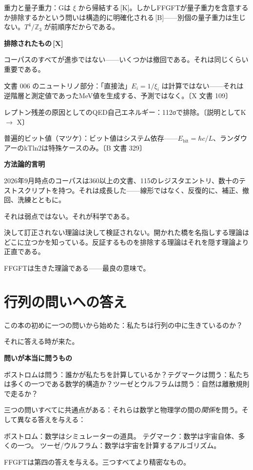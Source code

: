 \documentclass[11pt,openany]{book}
\newcommand{\status}[1]{\penalty10000\,{\tiny\textcolor{gray!70}{[#1]}}}
\begin{document}
重力と量子重力：Gは $\xi$ から帰結する\status{K}。しかしFFGFTが量子重力を含意するか排除するかという問いは構造的に明確化される\status{B}——別個の量子重力は生じない。$T^4/\mathbb{Z}_3$ が前順序だからである。

\textbf{排除されたもの\status{X}}

コーパスのすべてが進歩ではない——いくつかは撤回である。それは同じくらい重要である。

文書 006 のニュートリノ部分：「直接法」$E_i = 1/\xi_i$ は計算ではない——それは逆階層と測定値であったMeV値を生成する、予測ではなく。〔X 文書 109〕

レプトン残差の原因としてのQED自己エネルギー：112σで排除。〔説明としてK $\to$ X〕

普遍的ビット値（マツケ）：ビット値はシステム依存——$E_\text{bit} = \hbar c/L$、ランダウアーのkTln2は特殊ケースのみ。〔B 文書 329〕

\textbf{方法論的言明}

2026年9月時点のコーパスは360以上の文書、115のレジスタエントリ、数十のテストスクリプトを持つ。それは成長した——線形ではなく、反復的に、補正、撤回、洗練とともに。

それは弱点ではない。それが科学である。

決して訂正されない理論は決して検証されない。開かれた橋を名指しする理論はどこに立つかを知っている。反証するものを排除する理論はそれを隠す理論より正直である。

FFGFTは生きた理論である——最良の意味で。

\medskip

\chapter{行列の問いへの答え}

この本の初めに一つの問いから始めた：私たちは行列の中に生きているのか？

それに答える時が来た。

\textbf{問いが本当に問うもの}

ボストロムは問う：誰かが私たちを計算しているか？テグマークは問う：私たちは多くの一つである数学的構造か？ツーゼとウルフラムは問う：自然は離散規則で走るか？

三つの問いすべてに共通点がある：それらは数学と物理学の間の\textit{関係}を問う。そして異なる答えを与える：

ボストロム：数学はシミュレーターの道具。
テグマーク：数学は宇宙自体、多くの一つ。
ツーゼ/ウルフラム：数学は宇宙を計算するアルゴリズム。

FFGFTは第四の答えを与える。三つすべてより精密なもの。
\end{document}
